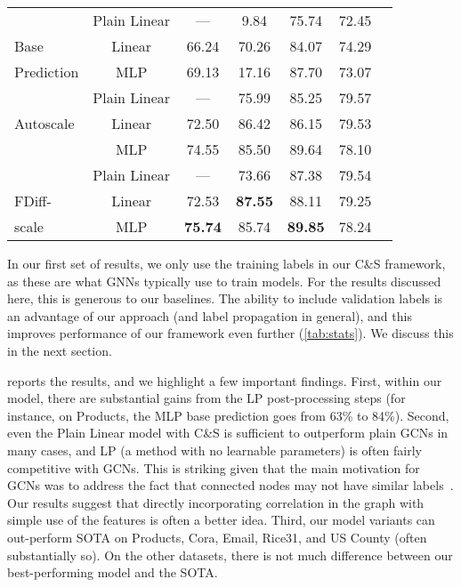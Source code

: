 \documentclass{article}
\begin{document}
\begin{table}[t]
\begin{center}
\begin{tabular}{lcccccc}
\midrule
& Plain Linear& --- & 9.84  & 75.74  & 72.45  \\
 Base  & Linear & 66.24  & 70.26   & 84.07  & 74.29   \\
 Prediction & MLP & 69.13  & 17.16  & 87.70  & 73.07  \\
 \midrule
&Plain Linear &	--- &  75.99 & 85.25	&  79.57\\
 Autoscale  &Linear	& 72.50	& 86.42 & 86.15	& 79.53 \\
&MLP	& 74.55	& 85.50 & 89.64	& 78.10\\
  \midrule
 & Plain Linear & --- & 73.66 & 87.38 & 79.54 \\
 FDiff-  & Linear&   72.53 & \textbf{87.55}	& 88.11	& 79.25 \\
scale& MLP&  \textbf{75.74}	& 85.74 & \textbf{89.85} & 78.24 \\
\bottomrule
\end{tabular}
\end{center}
\end{table}

In our first set of results, we only use the training labels in our C\&S framework,
as these are what GNNs typically use to train models.
For the results discussed here, this is generous to our baselines.
The ability to include validation labels is an advantage of our approach (and label propagation in general),
and this improves performance of our framework even further (\cref{tab:stats}).
We discuss this in the next section.

 reports the results, and we highlight a few important findings.
First, within our model, there are substantial gains from the LP post-processing steps 
(for instance, on Products, the MLP base prediction goes from 63\% to 84\%).
Second, even the Plain Linear model with C\&S is sufficient to outperform plain GCNs in many cases,
and LP (a method with no learnable parameters) is often fairly competitive with GCNs.
This is striking given that the main motivation for GCNs was to address the fact that connected
nodes may not have similar labels~\citep{kipf2017semi}.
Our results suggest that directly incorporating correlation in the graph with simple use of the features is often a better idea.
Third, our model variants can out-perform SOTA on Products, Cora, Email, Rice31, and US County (often substantially so).
On the other datasets, there is not much difference between our best-performing model and the SOTA.
\end{document}
